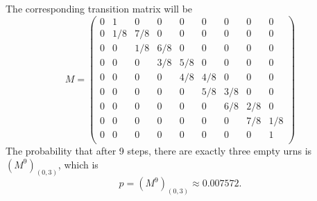 \begin{example}
\begin{solution}
\begin{center}
		\end{center}
		The corresponding transition matrix will be
		\[
		M = \begin{pmatrix}
			0 & 1 & 0 & 0 & 0 & 0 & 0 & 0 & 0 \\
			0 & 1/8 & 7/8 & 0 & 0 & 0 & 0 & 0 & 0 \\
			0 & 0 & 1/8 & 6/8 & 0 & 0 & 0 & 0 & 0 \\
			0 & 0 & 0 & 3/8 & 5/8 & 0 & 0 & 0 & 0 \\
			0 & 0 & 0 & 0 & 4/8 & 4/8 & 0 & 0 & 0 \\
			0 & 0 & 0 & 0 & 0 & 5/8 & 3/8 & 0 & 0 \\
			0 & 0 & 0 & 0 & 0 & 0 & 6/8 & 2/8 & 0 \\
			0 & 0 & 0 & 0 & 0 & 0 & 0 & 7/8 & 1/8 \\
			0 & 0 & 0 & 0 & 0 & 0 & 0 & 0 & 1 \\
		\end{pmatrix}
		\]
		The probability that after 9 steps, there are exactly three empty urns is $(M^9)_{(0,3)}$, which is
		\[ p = (M^9)_{(0,3)} \approx 0.007572. \]
	\end{solution}
\end{example}

